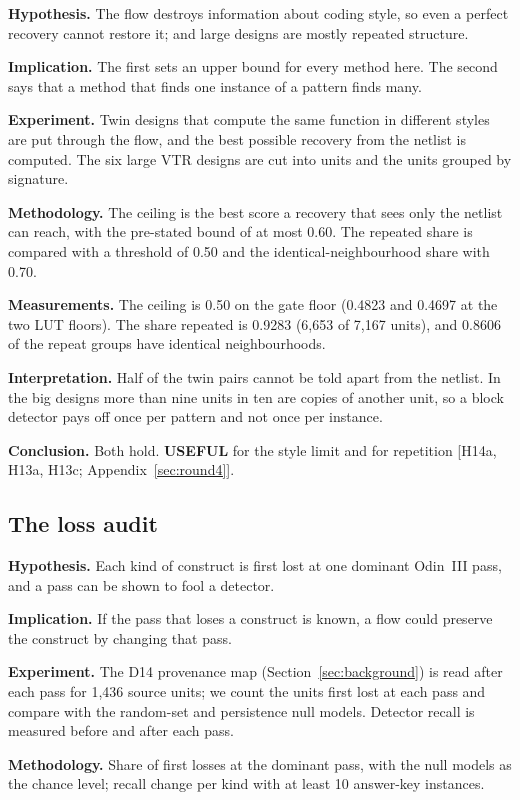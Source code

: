 \documentclass[conference]{IEEEtran}
\newcommand{\verdict}[1]{\textbf{\textsc{#1}}}
\newcommand{\hev}[1]{\par\smallskip\noindent\textbf{#1}}
\begin{document}
\hev{Hypothesis.} The flow destroys information about coding style, so even a perfect recovery cannot restore it; and large designs are mostly repeated structure.

\hev{Implication.} The first sets an upper bound for every method here. The second says that a method that finds one instance of a pattern finds many.

\hev{Experiment.} Twin designs that compute the same function in different styles are put through the flow, and the best possible recovery from the netlist is computed. The six large VTR designs are cut into units and the units grouped by signature.

\hev{Methodology.} The ceiling is the best score a recovery that sees only the netlist can reach, with the pre-stated bound of at most 0.60. The repeated share is compared with a threshold of 0.50 and the identical-neighbourhood share with 0.70.

\hev{Measurements.} The ceiling is 0.50 on the gate floor (0.4823 and 0.4697 at the two LUT floors). The share repeated is 0.9283 (6,653 of 7,167 units), and 0.8606 of the repeat groups have identical neighbourhoods.

\hev{Interpretation.} Half of the twin pairs cannot be told apart from the netlist. In the big designs more than nine units in ten are copies of another unit, so a block detector pays off once per pattern and not once per instance.

\hev{Conclusion.} Both hold. \verdict{USEFUL} for the style limit and for repetition [H14a, H13a, H13c; Appendix~\ref{sec:round4}].

\subsection{The loss audit}
\label{arg:ra6}

\hev{Hypothesis.} Each kind of construct is first lost at one dominant Odin~III pass, and a pass can be shown to fool a detector.

\hev{Implication.} If the pass that loses a construct is known, a flow could preserve the construct by changing that pass.

\hev{Experiment.} The D14 provenance map (Section~\ref{sec:background}) is read after each pass for 1,436 source units; we count the units first lost at each pass and compare with the random-set and persistence null models. Detector recall is measured before and after each pass.

\hev{Methodology.} Share of first losses at the dominant pass, with the null models as the chance level; recall change per kind with at least 10 answer-key instances.
\end{document}
